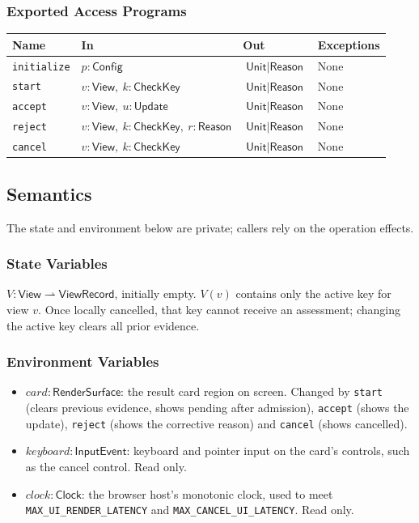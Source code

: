 \documentclass[12pt, titlepage]{article}
\newcommand{\ty}[1]{\textsf{#1}}
\newcommand{\key}{\ty{CheckKey}}
\newcommand{\Const}[1]{\texttt{#1}}
\begin{document}
\subsubsection{Exported Access Programs}

\begin{center}
\begin{tabular}{p{3.3cm} p{4cm} p{4cm} p{2.4cm}}
\hline
\textbf{Name} & \textbf{In} & \textbf{Out} & \textbf{Exceptions} \\
\hline
\texttt{initialize} & $p:\ty{Config}$ & $\ty{Unit}\mid\ty{Reason}$ & None \\
\texttt{start} & $v:\ty{View},\ k:\key$ & $\ty{Unit}\mid\ty{Reason}$ & None \\
\texttt{accept} & $v:\ty{View},\ u:\ty{Update}$ & $\ty{Unit}\mid\ty{Reason}$ & None \\
\texttt{reject} & $v:\ty{View},\ k:\key,\ r:\ty{Reason}$ & $\ty{Unit}\mid\ty{Reason}$ & None \\
\texttt{cancel} & $v:\ty{View},\ k:\key$ & $\ty{Unit}\mid\ty{Reason}$ & None \\
\hline
\end{tabular}
\end{center}

\subsection{Semantics}

The state and environment below are private; callers rely on the operation effects.

\subsubsection{State Variables}

$V:\ty{View}\rightharpoonup\ty{ViewRecord}$, initially empty. $V(v)$ contains only the active key for view $v$. Once locally cancelled, that key cannot receive an assessment; changing the active key clears all prior evidence.

\subsubsection{Environment Variables}

\begin{itemize}
\item $\mathit{card}:\ty{RenderSurface}$: the result card region on screen. Changed by \texttt{start} (clears previous evidence, shows pending after admission), \texttt{accept} (shows the update), \texttt{reject} (shows the corrective reason) and \texttt{cancel} (shows cancelled).
\item $\mathit{keyboard}:\ty{InputEvent}$: keyboard and pointer input on the card's controls, such as the cancel control. Read only.
\item $\mathit{clock}:\ty{Clock}$: the browser host's monotonic clock, used to meet \Const{MAX\_\allowbreak{}UI\_\allowbreak{}RENDER\_\allowbreak{}LATENCY} and \Const{MAX\_\allowbreak{}CANCEL\_\allowbreak{}UI\_\allowbreak{}LATENCY}. Read only.
\end{itemize}
\end{document}
